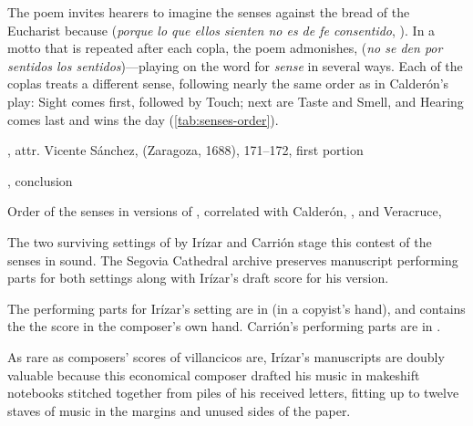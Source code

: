 The poem invites hearers to imagine the senses 
against the bread of the Eucharist because  (\emph{porque lo que ellos sienten no es de fe consentido},
).%
    \Autocite[171--172]{Sanchez:LiraPoetica}
In a motto that is repeated after each copla, the poem admonishes,  (\emph{no se den por sentidos los sentidos})---playing
on the word for \emph{sense} in several ways.  
Each of the coplas treats a different sense, following nearly the same order as
in Calderón's play: Sight comes first, followed by Touch; next are Taste and
Smell, and Hearing comes last and wins the day (\cref{tab:senses-order}).

\begin{poemexample}
    \caption{, attr. Vicente
    Sánchez,  (Zaragoza, 1688), 171--172, first portion}
    
    \label{poem:Si_los_sentidos-Sanchez-1}

\end{poemexample}

\begin{poemexample}
    \caption{, conclusion}

    \label{poem:Si_los_sentidos-Sanchez-2}

\end{poemexample}


\begin{table}
    \caption{Order of the senses in versions of ,
    correlated with Calderón, , and
    Veracruce, } 
    
    \label{tab:senses-order}

\end{table}

The two surviving settings of  by Irízar and Carrión
stage this contest of the senses in sound.
The Segovia Cathedral archive preserves manuscript performing parts for both
settings along with Irízar's draft score for his version.%
\begin{Footnote}
    The performing parts for Irízar's setting are in  (in a
    copyist's hand), and  contains the the score in the
    composer's own hand.
    Carrión's performing parts are in .
\end{Footnote}
As rare as composers' scores of villancicos are, Irízar's manuscripts are doubly
valuable because this economical composer drafted his music in makeshift
notebooks stitched together from piles of his received letters, fitting up to
twelve staves of music in the margins and unused sides of the paper.

